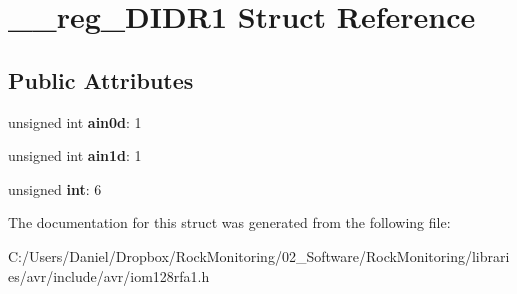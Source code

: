 \hypertarget{struct____reg___d_i_d_r1}{}\section{\+\_\+\+\_\+reg\+\_\+\+D\+I\+D\+R1 Struct Reference}
\label{struct____reg___d_i_d_r1}
\subsection*{Public Attributes}
\begin{DoxyCompactItemize}
\item 
unsigned int {\bfseries ain0d}\+: 1\hypertarget{struct____reg___d_i_d_r1_a906cec830ae401dc46b970ca5b66925c}{}\label{struct____reg___d_i_d_r1_a906cec830ae401dc46b970ca5b66925c}

\item 
unsigned int {\bfseries ain1d}\+: 1\hypertarget{struct____reg___d_i_d_r1_a2445d361be0effb1f8b4a88a5174ba00}{}\label{struct____reg___d_i_d_r1_a2445d361be0effb1f8b4a88a5174ba00}

\item 
unsigned {\bfseries int}\+: 6\hypertarget{struct____reg___d_i_d_r1_a52bd97c997ef885ae06bdf492b72c0a9}{}\label{struct____reg___d_i_d_r1_a52bd97c997ef885ae06bdf492b72c0a9}

\end{DoxyCompactItemize}


The documentation for this struct was generated from the following file\+:\begin{DoxyCompactItemize}
\item 
C\+:/\+Users/\+Daniel/\+Dropbox/\+Rock\+Monitoring/02\+\_\+\+Software/\+Rock\+Monitoring/libraries/avr/include/avr/iom128rfa1.\+h\end{DoxyCompactItemize}
